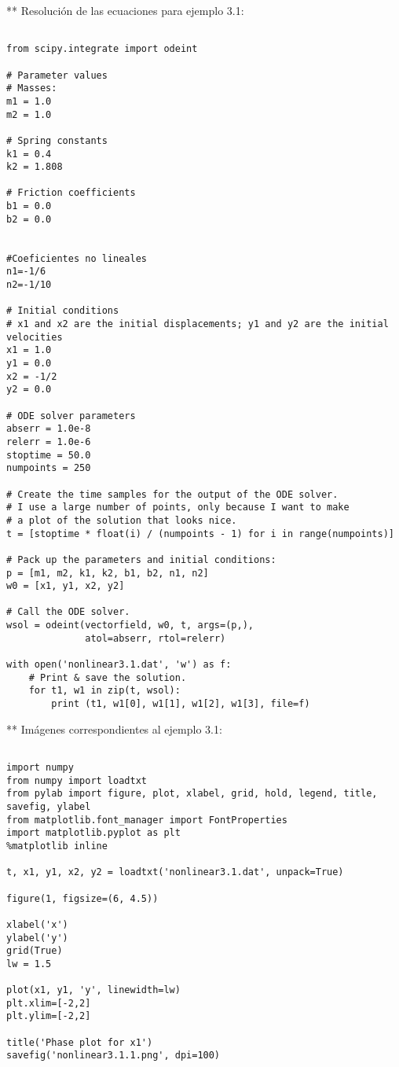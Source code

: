 \documentclass{article} %
\begin{document}
** Resolución de las ecuaciones para ejemplo 3.1:

\begin{verbatim} 

from scipy.integrate import odeint

# Parameter values
# Masses:
m1 = 1.0
m2 = 1.0

# Spring constants
k1 = 0.4
k2 = 1.808

# Friction coefficients
b1 = 0.0
b2 = 0.0


#Coeficientes no lineales
n1=-1/6
n2=-1/10

# Initial conditions
# x1 and x2 are the initial displacements; y1 and y2 are the initial velocities
x1 = 1.0
y1 = 0.0
x2 = -1/2
y2 = 0.0

# ODE solver parameters
abserr = 1.0e-8
relerr = 1.0e-6
stoptime = 50.0
numpoints = 250

# Create the time samples for the output of the ODE solver.
# I use a large number of points, only because I want to make
# a plot of the solution that looks nice.
t = [stoptime * float(i) / (numpoints - 1) for i in range(numpoints)]

# Pack up the parameters and initial conditions:
p = [m1, m2, k1, k2, b1, b2, n1, n2]
w0 = [x1, y1, x2, y2]

# Call the ODE solver.
wsol = odeint(vectorfield, w0, t, args=(p,),
              atol=abserr, rtol=relerr)

with open('nonlinear3.1.dat', 'w') as f:
    # Print & save the solution.
    for t1, w1 in zip(t, wsol):
        print (t1, w1[0], w1[1], w1[2], w1[3], file=f)

\end{verbatim}


** Imágenes correspondientes al ejemplo 3.1:


\begin{verbatim} 

import numpy
from numpy import loadtxt
from pylab import figure, plot, xlabel, grid, hold, legend, title, savefig, ylabel
from matplotlib.font_manager import FontProperties
import matplotlib.pyplot as plt
%matplotlib inline

t, x1, y1, x2, y2 = loadtxt('nonlinear3.1.dat', unpack=True)

figure(1, figsize=(6, 4.5))

xlabel('x')
ylabel('y')
grid(True)
lw = 1.5

plot(x1, y1, 'y', linewidth=lw)
plt.xlim=[-2,2]
plt.ylim=[-2,2]

title('Phase plot for x1')
savefig('nonlinear3.1.1.png', dpi=100)

\end{verbatim}
\end{document}
